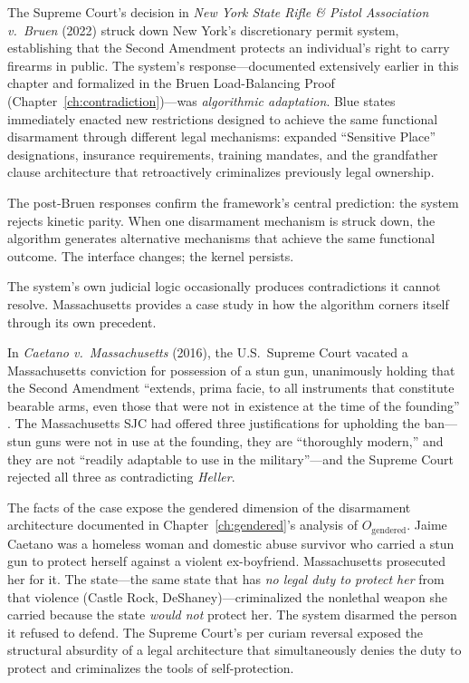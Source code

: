 The Supreme Court's decision in \textit{New York State Rifle \& Pistol Association v.\ Bruen} (2022) struck down New York's discretionary permit system, establishing that the Second Amendment protects an individual's right to carry firearms in public. The system's response---documented extensively earlier in this chapter and formalized in the Bruen Load-Balancing Proof (Chapter~\ref{ch:contradiction})---was \textit{algorithmic adaptation}. Blue states immediately enacted new restrictions designed to achieve the same functional disarmament through different legal mechanisms: expanded ``Sensitive Place'' designations, insurance requirements, training mandates, and the grandfather clause architecture that retroactively criminalizes previously legal ownership.

The post-Bruen responses confirm the framework's central prediction: the system rejects kinetic parity. When one disarmament mechanism is struck down, the algorithm generates alternative mechanisms that achieve the same functional outcome. The interface changes; the kernel persists.

The system's own judicial logic occasionally produces contradictions it cannot resolve. Massachusetts provides a case study in how the algorithm corners itself through its own precedent.

In \textit{Caetano v.\ Massachusetts} (2016), the U.S.\ Supreme Court vacated a Massachusetts conviction for possession of a stun gun, unanimously holding that the Second Amendment ``extends, prima facie, to all instruments that constitute bearable arms, even those that were not in existence at the time of the founding'' \cite{caetano}. The Massachusetts SJC had offered three justifications for upholding the ban---stun guns were not in use at the founding, they are ``thoroughly modern,'' and they are not ``readily adaptable to use in the military''---and the Supreme Court rejected all three as contradicting \textit{Heller}.

The facts of the case expose the gendered dimension of the disarmament architecture documented in Chapter~\ref{ch:gendered}'s analysis of $O_{\text{gendered}}$. Jaime Caetano was a homeless woman and domestic abuse survivor who carried a stun gun to protect herself against a violent ex-boyfriend. Massachusetts prosecuted her for it. The state---the same state that has \textit{no legal duty to protect her} from that violence (Castle Rock, DeShaney)---criminalized the nonlethal weapon she carried because the state \textit{would not} protect her. The system disarmed the person it refused to defend. The Supreme Court's per curiam reversal exposed the structural absurdity of a legal architecture that simultaneously denies the duty to protect and criminalizes the tools of self-protection.


